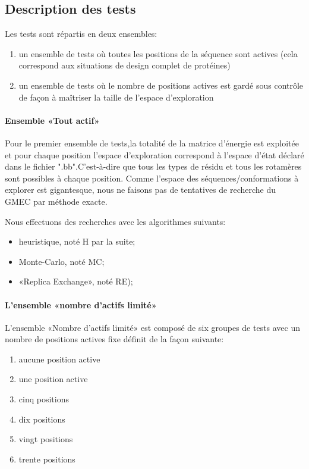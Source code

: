 \subsection{Description des tests}
\label{sec:description_tests}
Les tests sont répartis en deux ensembles:
\begin{enumerate}
\item un ensemble de tests où toutes les positions de la séquence sont actives (cela correspond aux situations de design complet de protéines) 
\item un ensemble de tests où le nombre de positions actives est gardé sous contrôle de façon à maîtriser la taille de l'espace d'exploration
\end{enumerate}


\paragraph{Ensemble «Tout actif»}
\label{methode_TTactif}
Pour le premier ensemble de tests,la totalité de la matrice d'énergie est exploitée et pour chaque position l'espace d'exploration correspond à l'espace d'état déclaré dans le fichier ".bb".C'est-à-dire que tous les types de résidu et tous les rotamères sont possibles à chaque position.
Comme l'espace des séquences/conformations à explorer est gigantesque, nous ne faisons pas de tentatives de recherche du GMEC  par méthode exacte. 

Nous effectuons des recherches avec les algorithmes suivants:

\begin{itemize}
\item heuristique, noté H par la suite;
\item Monte-Carlo, noté MC;
\item «Replica Exchange», noté RE);
\end{itemize}


\paragraph{L'ensemble «nombre d'actifs limité»}

L'ensemble «Nombre d'actifs limité» est composé de six groupes de tests avec un nombre de positions actives fixe définit de la façon suivante:  


\begin{enumerate}
\item aucune position active
\item une position active 
\item cinq positions 
\item dix  positions 
\item vingt positions 
\item trente positions 
\end{enumerate}

